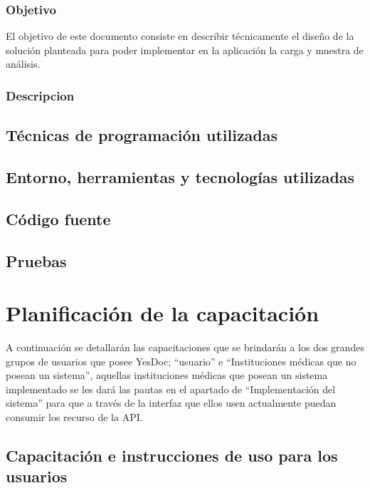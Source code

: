 \documentclass[a4paper,12pt]{article}
\begin{document}
\subsubsection{Objetivo}
El objetivo de este documento consiste en describir técnicamente el diseño de la solución planteada para poder implementar en la aplicación la carga y muestra de análisis.

\subsubsection{Descripcion}%



\subsection{Técnicas de programación utilizadas}
\subsection{Entorno, herramientas y tecnologías utilizadas}
\subsection{Código fuente}
\subsection{Pruebas}













\section{Planificación de la capacitación}
A continuación se detallarán las capacitaciones que se brindarán a los dos grandes grupos de usuarios que posee YesDoc; ``usuario'' e ``Instituciones médicas que no posean un sistema'', aquellas instituciones médicas que posean un sistema implementado se les dará las pautas en el apartado de ``Implementación del sistema'' para que a través de la interfaz que ellos usen actualmente puedan consumir los recurso de la API.

\subsection{Capacitación e instrucciones de uso para los usuarios}
\end{document}
